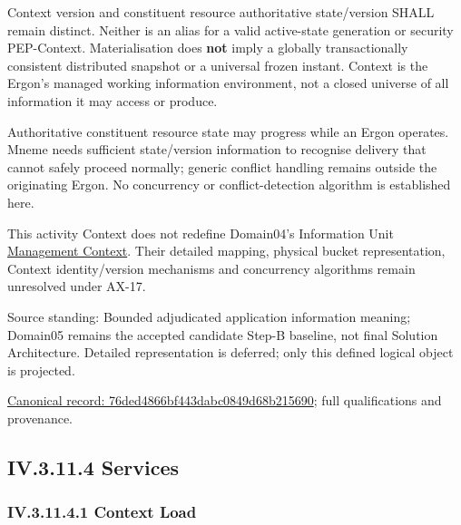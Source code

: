 Context version and constituent resource authoritative state/version SHALL
remain distinct. Neither is an alias for a valid active-state generation or
security PEP-Context. Materialisation does \textbf{not} imply a globally
transactionally consistent distributed snapshot or a universal frozen instant.
Context is the Ergon's managed working information environment, not a closed
universe of all information it may access or produce.



Authoritative constituent resource state may progress while an Ergon operates.
Mneme needs sufficient state/version information to recognise delivery that cannot
safely proceed normally; generic conflict handling remains outside the originating
Ergon. No concurrency or conflict-detection algorithm is established here.



This activity Context does not redefine Domain04's Information Unit
\href{\detokenize{../../../../../../../../../docs/markdown/04-information-architecture/metamodel/information-architecture-metamodel.md#65-context}}{Management Context}.
Their detailed mapping, physical bucket representation, Context identity/version
mechanisms and concurrency algorithms remain unresolved under AX-17.



Source standing: Bounded adjudicated application information meaning; Domain05 remains the accepted candidate Step-B baseline, not final Solution Architecture. Detailed representation is deferred; only this defined logical object is projected.


{\footnotesize \href{../../../../../../../../continuum/application/data-object/76ded4866bf443dabc0849d68b215690.md}{Canonical record: 76ded4866bf443dabc0849d68b215690}; full qualifications and provenance.}\par
\subsection*{IV.3.11.4 Services}
\label{navigation:IV.3.11.4}

\subsubsection*{IV.3.11.4.1 Context Load}
\label{navigation:IV.3.11.4.1}


